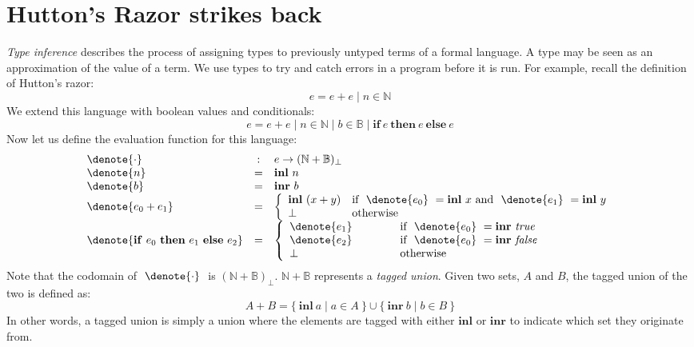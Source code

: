 \section{Hutton's Razor strikes back}

\question \emph{Type inference} describes the process of assigning types to previously untyped terms of a formal language. A type may be seen as an approximation of the value of a term. We use types to try and catch errors in a program before it is run. For example, recall the definition of Hutton's razor:
\begin{displaymath}
e = e + e \mid n \in \mathbb{N}
\end{displaymath}
We extend this language with boolean values and conditionals:
\begin{displaymath}
e = e + e \mid n \in \mathbb{N} \mid b \in \mathbb{B} \mid \mathbf{if}~e~\mathbf{then}~e~\mathbf{else}~e
\end{displaymath}
Now let us define the evaluation function for this language:
\begin{displaymath}
\begin{array}{lcl}
\denote{\cdot} & : & e \to (\mathbb{N} + \mathbb{B})_{\bot}\\
\denote{n}         & = & \mathbf{inl}~n \\
\denote{b}         & = & \mathbf{inr}~b \\
\denote{e_0 + e_1} & = & \left\{ \begin{array}{ll}
\mathbf{inl}~(x + y) & \text{if } ~\denote{e_0}~ = \mathbf{inl}~x \text{ and } ~\denote{e_1}~ = \mathbf{inl}~y \\
\bot & \text{otherwise}
\end{array}  \right.\\
\denote{\mathbf{if}~e_0~\mathbf{then}~e_1~\mathbf{else}~e_2} & = & \left\{\begin{array}{ll}
\denote{e_1} & \qquad \quad \; \text{if } ~\denote{e_0}~ = \mathbf{inr}~\mathit{true}\\
\denote{e_2} & \qquad \quad \; \text{if } ~\denote{e_0}~ = \mathbf{inr}~\mathit{false}\\
\bot         & \qquad \quad \; \text{otherwise}
\end{array}\right.
\end{array}
\end{displaymath}
Note that the codomain of $~\denote{\cdot}~$ is $(\mathbb{N} + \mathbb{B})_{\bot}$. $\mathbb{N} + \mathbb{B}$ represents a \emph{tagged union}. Given two sets, $A$ and $B$, the tagged union of the two is defined as:
\begin{displaymath}
A + B = \{~\mathbf{inl}~a \mid a \in A~\} \cup \{~\mathbf{inr}~b \mid b \in B~\}
\end{displaymath}  
In other words, a tagged union is simply a union where the elements are tagged with either $\mathbf{inl}$ or $\mathbf{inr}$ to indicate which set they originate from.

